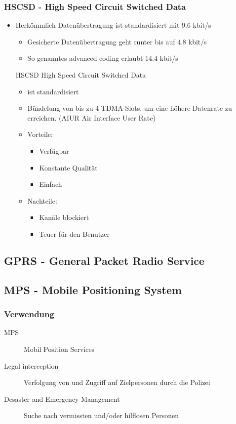 \subsubsection{HSCSD - High Speed Circuit Switched Data}
\begin{itemize}
\item Herkömmlich Datenübertragung ist standardisiert mit 9.6 kbit/s
\begin{itemize}
\item Gesicherte Datenübertragung geht runter bis auf 4.8 kbit/s
\item So genanntes advanced coding erlaubt 14.4 kbit/s
\end{itemize}
HSCSD High Speed Circuit Switched Data
\begin{itemize}
\item ist standardisiert
\item Bündelung von bis zu 4 TDMA-Slots, um eine höhere Datenrate zu erreichen. (AIUR Air Interface User Rate)
\item Vorteile:
\begin{itemize}
\item Verfügbar
\item Konstante Qualität
\item Einfach
\end{itemize}
\item Nachteile:
\begin{itemize}
\item Kanäle blockiert
\item Teuer für den Benutzer
\end{itemize}
\end{itemize}
\end{itemize}


\subsection{GPRS - General Packet Radio Service}



\subsection{MPS - Mobile Positioning System}

\subsubsection{Verwendung}
\begin{description}
\item [MPS] Mobil Position Services
\item [Legal interception] Verfolgung von und Zugriff auf Zielpersonen durch die Polizei
\item [Desaster and Emergency Management] Suche nach vermissten und/oder hilflosen Personen
\end{description}
\vspace{0.5cm}

